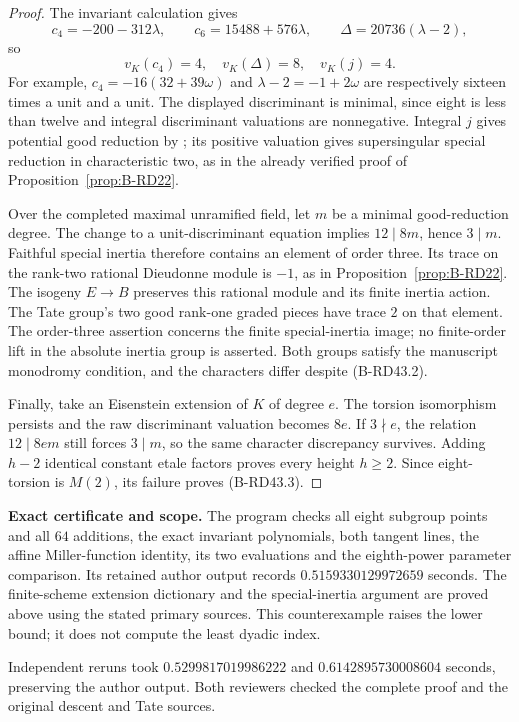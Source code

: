 \begin{proof}
The invariant calculation gives
\[
 c_4=-200-312\lambda,\qquad
 c_6=15488+576\lambda,\qquad
 \Delta=20736(\lambda-2),
\]
so
\[
                     v_K(c_4)=4,\quad v_K(\Delta)=8,
                     \quad v_K(j)=4.
                                                        \tag{B-RD43.7}
\]
For example, $c_4=-16(32+39\omega)$ and
$\lambda-2=-1+2\omega$ are respectively sixteen times a unit
and a unit. The displayed discriminant is minimal, since eight
is less than twelve and integral discriminant valuations are
nonnegative. Integral $j$ gives potential good reduction by
\citet[Section~2, p.~496]{SerreTate1968Good}; its positive valuation
gives supersingular special reduction in characteristic two,
as in the already verified proof of Proposition~\ref{prop:B-RD22}.

Over the completed maximal unramified field, let $m$ be a minimal
good-reduction degree. The change to a unit-discriminant equation
implies $12\mid8m$, hence $3\mid m$. Faithful special inertia
therefore contains an element of order three. Its trace on the
rank-two rational Dieudonne module is $-1$, as in
Proposition~\ref{prop:B-RD22}. The isogeny $E\to B$ preserves this
rational module and its finite inertia action. The Tate group's
two good rank-one graded pieces have trace $2$ on that element.
The order-three assertion concerns the finite special-inertia image;
no finite-order lift in the absolute inertia group is asserted.
Both groups satisfy the manuscript monodromy condition, and the
characters differ despite (B-RD43.2).

Finally, take an Eisenstein extension of $K$ of degree $e$.
The torsion isomorphism persists and the raw discriminant valuation
becomes $8e$. If $3\nmid e$, the relation $12\mid8em$ still
forces $3\mid m$, so the same character discrepancy survives.
Adding $h-2$ identical constant etale factors proves every height
$h\ge2$. Since eight-torsion is $M(2)$, its failure proves
(B-RD43.3).
\end{proof}

\par\smallskip\noindent\textbf{Exact certificate and scope.}
The program  checks all eight
subgroup points and all $64$ additions, the exact invariant
polynomials, both tangent lines, the affine Miller-function identity,
its two evaluations and the eighth-power parameter comparison.
Its retained author output records $0.5159330129972659$ seconds.
The finite-scheme extension dictionary and the special-inertia
argument are proved above using the stated primary sources.
This counterexample raises the lower bound; it does not compute
the least dyadic index.

Independent reruns took $0.5299817019986222$ and
$0.6142895730008604$ seconds, preserving the author output. Both reviewers
checked the complete proof and the original descent and Tate sources.

